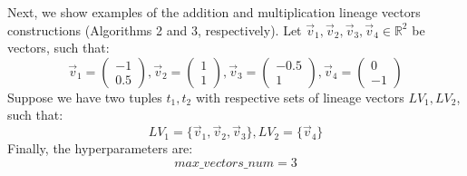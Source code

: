 \begin{runexample}
    Next, we show examples of the addition and multiplication lineage vectors constructions (Algorithms 2 and 3, respectively).
    Let $\vec v_1, \vec v_2, \vec v_3, \vec v_4 \in \mathbb{R}^2$ be vectors, such that:
    \begin{equation*}
        \vec v_1 = \begin{pmatrix} -1\\ 0.5 \end{pmatrix},
        \vec v_2 = \begin{pmatrix} 1\\ 1 \end{pmatrix},
        \vec v_3 = \begin{pmatrix} -0.5\\ 1 \end{pmatrix},
        \vec v_4 = \begin{pmatrix} 0\\ -1 \end{pmatrix}
    \end{equation*}
    Suppose we have two tuples $t_1, t_2$ with respective sets of lineage vectors $LV_1, LV_2$, such that:
    \begin{equation*}
        LV_1 = \{\vec v_1, \vec v_2, \vec v_3\}, LV_2 = \{\vec v_4\}
    \end{equation*}
    Finally, the hyperparameters are:
    \begin{equation*}
        max\_vectors\_num = 3
    \end{equation*}
\end{runexample}
